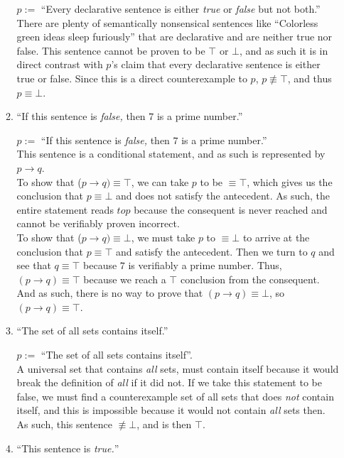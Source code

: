 \documentclass[11pt,a4paper]{article}
\begin{document}
\begin{enumerate}
\begin{enumerate}
        $p := $ ``Every declarative sentence is either \emph{true} or \emph{false} but not both.'' \\ There are plenty of semantically nonsensical sentences like ``Colorless green ideas sleep furiously'' that are declarative and are neither true nor false. This sentence cannot be proven to be $\top$ or $\bot$, and as such it is in direct contrast with $p$'s claim that every declarative sentence is either true or false. Since this is a direct counterexample to $p$, $p \not\equiv \top$, and thus $p \equiv \bot$.
      \item
        ``If this sentence is \emph{false,} then $7$ is a prime number.''%

        $p := $ ``If this sentence is \emph{false,} then $7$ is a prime number.'' \\ This sentence is a conditional statement, and as such is represented by $p \rightarrow q$. \\ To show that ($p \rightarrow q) \equiv \top$, we can take $p$ to be $\equiv \top$, which gives us the conclusion that $p \equiv \bot$ and does not satisfy the antecedent. As such, the entire statement reads $top$ because the consequent is never reached and cannot be verifiably proven incorrect. \\ To show that ($p \rightarrow q) \equiv \bot$, we must take $p$ to $\equiv \bot$ to arrive at the conclusion that $p \equiv \top$ and satisfy the antecedent. Then we turn to $q$ and see that $q \equiv \top$ because $7$ is verifiably a prime number. Thus, $(p \rightarrow q) \equiv \top$ because we reach a $\top$ conclusion from the consequent. \\ And as such, there is no way to prove that $(p \rightarrow q) \equiv \bot$, so $(p \rightarrow q) \equiv \top$.
      \item
        ``The set of all sets contains itself.''

        $p := $ ``The set of all sets contains itself''. \\ A universal set that contains \emph{all} sets, must contain itself because it would break the definition of \emph{all} if it did not. If we take this statement to be false, we must find a counterexample set of all sets that does \emph{not} contain itself, and this is impossible because it would not contain \emph{all} sets then. \\ As such, this sentence $\not\equiv \bot$, and is then $\top$.
      \item
        ``This sentence is \emph{true.}''


\end{enumerate}
\end{enumerate}
\end{document}

